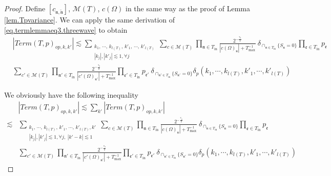 \begin{proof}
Define $[c_{\mathfrak{n},\widetilde{\mathfrak{n}}}]$, $\mathscr{M}(T)$, $c(\Omega)$ in the same way as the proof of Lemma \ref{lem.Tpvariance}. We can apply the same derivation of \eqref{eq.termlemmaeq3.threewave} to obtain
\begin{equation}\label{eq.termlemmaeq3op.threewave}
\begin{split}
    &|Term(T, p)_{op,k,k'}|\lesssim \sum_{\substack{k_1,\, \cdots,\, k_{l(T)},\, k'_1,\, \cdots,\, k'_{l(T)}\\ |k_{j}|, |k'_j|\lesssim 1, \forall j}} \sum_{c\in \mathscr{M}(T) }\prod_{\mathfrak{n}\in T_{\text{in}}}\frac{2^{-\frac{\tau_{\mathfrak{n}}}{2}}}{|c(\Omega)_{\mathfrak{n}}|+T^{-1}_{\text{max}}}    \ \delta_{\cap_{\mathfrak{n}\in T_{\text{in}}} \{S_{\mathfrak{n}}=0\}}\prod_{\mathfrak{e}\in T_{\text{in}}} p_{\mathfrak{e}} 
    \\
    &\sum_{c'\in \mathscr{M}(T)}\prod_{\mathfrak{n}'\in T_{\text{in}}}\frac{2^{-\frac{\tau_{\mathfrak{n}}}{2}}}{|c'(\Omega)_{\mathfrak{n}'}|+T^{-1}_{\text{max}}} \prod_{\mathfrak{e}'\in T_{\text{in}}} p_{\mathfrak{e}'}  \ \delta_{\cap_{\mathfrak{n}'\in T_{\text{in}}} \{S_{\mathfrak{n}'}=0\}} \delta_{p}(k_1,\cdots, k_{l(T)}, k'_1,\cdots, k'_{l(T)})
\end{split}
\end{equation}

We obviously have the following inequality
\begin{equation}\label{eq.termlemmaeq4op.threewave}
\begin{split}
    &|Term(T, p)_{op,k,k'}|\lesssim \sum_{k'}|Term(T, p)_{op,k,k'}|
    \\
    \lesssim& \sum_{\substack{k_1,\, \cdots,\, k_{l(T)},\, k'_1,\, \cdots,\, k'_{l(T)}, k'\\ |k_{j}|, |k'_j|\lesssim 1, \forall j,\ |k'-k|\lesssim 1}} \sum_{c\in \mathscr{M}(T) }\prod_{\mathfrak{n}\in T_{\text{in}}}\frac{2^{-\frac{\tau_{\mathfrak{n}}}{2}}}{|c(\Omega)_{\mathfrak{n}}|+T^{-1}_{\text{max}}}    \ \delta_{\cap_{\mathfrak{n}\in T_{\text{in}}} \{S_{\mathfrak{n}}=0\}} \prod_{\mathfrak{e}\in T_{\text{in}}} p_{\mathfrak{e}}
    \\
    &\sum_{c'\in \mathscr{M}(T)}\prod_{\mathfrak{n}'\in T_{\text{in}}}\frac{2^{-\frac{\tau_{\mathfrak{n}}}{2}}}{|c'(\Omega)_{\mathfrak{n}'}|+T^{-1}_{\text{max}}}  \prod_{\mathfrak{e}'\in T_{\text{in}}} p_{\mathfrak{e}'}  \ \delta_{\cap_{\mathfrak{n}'\in T_{\text{in}}} \{S_{\mathfrak{n}'}=0\}} \delta_{p}(k_1,\cdots, k_{l(T)}, k'_1,\cdots, k'_{l(T)})
\end{split}
\end{equation}


\end{proof}
